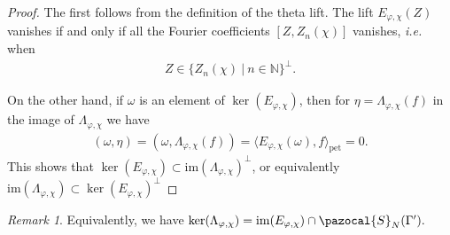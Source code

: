 \documentclass[a4paper,11pt]{amsart} %
\newcommand{\8}{\infty}
\newcommand{\NN}{\mathbb{N}}
\newcommand{\Scal}{\pazocal{S}}
\newcommand{\pet}{\mathrm{pet}}
\newcommand{\image}{\mathrm{im}}
\theoremstyle{mytheoremstyle}
\theoremstyle{remark}
\newtheorem{rmk}{Remark}[section]
\numberwithin{equation}{section}
\begin{document}
\begin{proof} The first follows from the definition of the theta lift.  The lift $E_{\varphi, \chi}(Z)$ vanishes if and only if all the Fourier coefficients $[ Z,Z_n(\chi) ]$ vanishes, {\em i.e.} when 
\begin{align}
Z \in \{Z_n(\chi) \ \vert \ n \in \NN \}^\perp.
\end{align}

On the other hand, if $\omega$ is an element of $\ker(E_{\varphi, \chi})$, then for $\eta=\Lambda_{\varphi, \chi}(f)$ in the image of $\Lambda_{\varphi, \chi}$ we have
\begin{align}
( \omega, \eta )= ( \omega, \Lambda_{\varphi, \chi}(f) ) = \langle E_{\varphi, \chi}(\omega), f \rangle_{\pet}=0.
\end{align}
This shows that $\ker(E_{\varphi, \chi}) \subset \image(\Lambda_{\varphi, \chi})^\perp$, or equivalently $\image(\Lambda_{\varphi, \chi})\subset \ker(E_{\varphi, \chi})^\perp $ 
\end{proof}

\begin{rmk}
Equivalently, we have $\ker(\Lambda_{\varphi, \chi})=\image(E_{\varphi, \chi}) \cap \Scal_N(\Gamma').$
\end{rmk}
\end{document}
